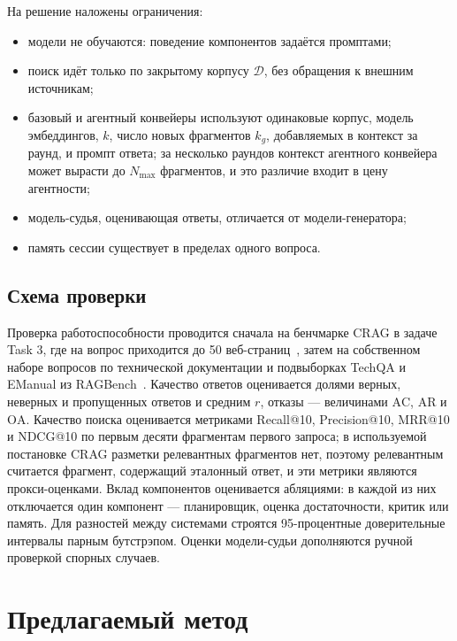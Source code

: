 \documentclass{misisarticle}
\begin{document}
На решение наложены ограничения:
\begin{itemize}[nosep]
  \item модели не обучаются: поведение компонентов задаётся промптами;
  \item поиск идёт только по закрытому корпусу $\mathcal{D}$, без обращения к внешним источникам;
  \item базовый и агентный конвейеры используют одинаковые корпус, модель эмбеддингов, $k$, число новых фрагментов $k_g$, добавляемых в контекст за раунд, и промпт ответа; за несколько раундов контекст агентного конвейера может вырасти до $N_{\max}$ фрагментов, и это различие входит в цену агентности;
  \item модель-судья, оценивающая ответы, отличается от модели-генератора;
  \item память сессии существует в пределах одного вопроса.
\end{itemize}

\subsection{Схема проверки}

Проверка работоспособности проводится сначала на бенчмарке CRAG в задаче Task 3, где на вопрос приходится до 50 веб-страниц~\cite{yang2024crag}, %
затем на собственном наборе вопросов по технической документации и подвыборках TechQA и EManual из RAGBench~\cite{friel2024ragbench}. %
Качество ответов оценивается долями верных, неверных и пропущенных ответов и средним $r$, отказы --- величинами $\mathrm{AC}$, $\mathrm{AR}$ и $\mathrm{OA}$.
Качество поиска оценивается метриками Recall@10, Precision@10, MRR@10 и NDCG@10 по первым десяти фрагментам первого запроса; в используемой постановке CRAG разметки релевантных фрагментов нет, поэтому релевантным считается фрагмент, содержащий эталонный ответ, и эти метрики являются прокси-оценками.
Вклад компонентов оценивается абляциями: в каждой из них отключается один компонент --- планировщик, оценка достаточности, критик или память.
Для разностей между системами строятся 95-процентные доверительные интервалы парным бутстрэпом.
Оценки модели-судьи дополняются ручной проверкой спорных случаев.

\section{Предлагаемый метод}\label{sec:method}
\end{document}
